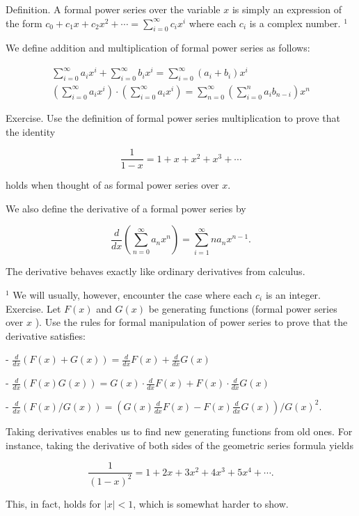 \documentclass[12pt]{exam}
\begin{document}
Definition. A formal power series over the variable $x$ is simply an expression of the form $c_{0}+c_{1} x+c_{2} x^{2}+\cdots=\sum_{i=0}^{\infty} c_{i} x^{i}$ where each $c_{i}$ is a complex number. ${ }^{1}$

We define addition and multiplication of formal power series as follows:

$$
\begin{gathered}
\sum_{i=0}^{\infty} a_{i} x^{i}+\sum_{i=0}^{\infty} b_{i} x^{i}=\sum_{i=0}^{\infty}\left(a_{i}+b_{i}\right) x^{i} \\
\left(\sum_{i=0}^{\infty} a_{i} x^{i}\right) \cdot\left(\sum_{i=0}^{\infty} a_{i} x^{i}\right)=\sum_{n=0}^{\infty}\left(\sum_{i=0}^{n} a_{i} b_{n-i}\right) x^{n}
\end{gathered}
$$

Exercise. Use the definition of formal power series multiplication to prove that the identity

$$
\frac{1}{1-x}=1+x+x^{2}+x^{3}+\cdots
$$

holds when thought of as formal power series over $x$.

We also define the derivative of a formal power series by

$$
\frac{d}{d x}\left(\sum_{n=0}^{\infty} a_{n} x^{n}\right)=\sum_{i=1}^{\infty} n a_{n} x^{n-1} .
$$

The derivative behaves exactly like ordinary derivatives from calculus.

${ }^{1}$ We will usually, however, encounter the case where each $c_{i}$ is an integer. Exercise. Let $F(x)$ and $G(x)$ be generating functions (formal power series over $x$ ). Use the rules for formal manipulation of power series to prove that the derivative satisfies:

- $\frac{d}{d x}(F(x)+G(x))=\frac{d}{d x} F(x)+\frac{d}{d x} G(x)$

- $\frac{d}{d x}(F(x) G(x))=G(x) \cdot \frac{d}{d x} F(x)+F(x) \cdot \frac{d}{d x} G(x)$

- $\frac{d}{d x}(F(x) / G(x))=\left(G(x) \frac{d}{d x} F(x)-F(x) \frac{d}{d x} G(x)\right) / G(x)^{2}$.

Taking derivatives enables us to find new generating functions from old ones. For instance, taking the derivative of both sides of the geometric series formula yields

$$
\frac{1}{(1-x)^{2}}=1+2 x+3 x^{2}+4 x^{3}+5 x^{4}+\cdots .
$$

This, in fact, holds for $|x|<1$, which is somewhat harder to show.
\end{document}
